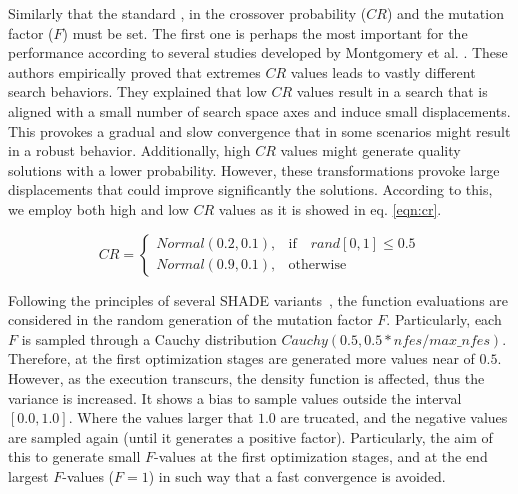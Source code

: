 %
Similarly that the standard \DE{}, in \DEEDM{} the crossover probability ($CR$) and the mutation factor ($F$) must be set.
%
The first one is perhaps the most important for the performance according to several studies developed by Montgomery 
et al. \cite{montgomery2010analysis}.
%
These authors empirically proved that extremes $CR$ values leads to vastly different search behaviors.
%
They explained that low $CR$ values result in a search that is aligned with a small number of search space axes and
induce small displacements.
%
This provokes a gradual and slow convergence that in some scenarios might result in a robust behavior.
%
Additionally, high $CR$ values might generate quality solutions with a lower probability.
%
However, these transformations provoke large displacements that could improve significantly the solutions.
%
According to this, we employ both high and low $CR$ values as it is showed in eq. \ref{eqn:cr}.

\begin{equation} \label{eqn:cr}
CR = 
\begin{cases}
     Normal(0.2, 0.1),& \text{if} \quad rand[0,1] \leq 0.5  \\
     Normal(0.9, 0.1),              & \text{otherwise}
\end{cases}
\end{equation}


Following the principles of several SHADE variants~\cite{awad2016ensemble, brest2016shade}, the function evaluations are considered in the random generation of the mutation factor $F$.
%
Particularly, each $F$ is sampled through a Cauchy distribution $Cauchy(0.5, 0.5*nfes/max\_nfes)$.
%
Therefore, at the first optimization stages are generated more values near of $0.5$.
%
However, as the execution transcurs, the density function is affected, thus the variance is increased.
%
It shows a bias to sample values outside the interval $[0.0, 1.0]$.
%
Where the values larger that $1.0$ are trucated, and the negative values are sampled again (until it generates a positive factor).
%
Particularly, the aim of this to generate small $F$-values at the first optimization stages, and at the end largest $F$-values ($F=1$) in such way that a fast convergence is avoided.
%
%

%




